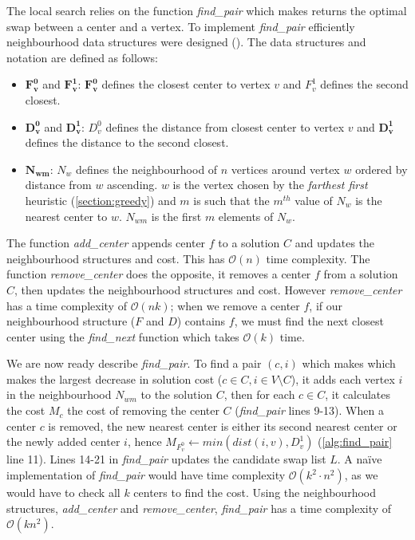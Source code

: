 The local search relies on the function \emph{find\_pair} which makes returns the optimal swap between a center and a vertex. To implement \emph{find\_pair} efficiently neighbourhood data structures were designed (\cite{mladenovic_solving_2003,pullan_memetic_2008}). The data structures and notation are defined as follows:
\begin{itemize}
    \item $\mathbf{F^0_v}$ and $\mathbf{F^1_v}$: $\mathbf{F^0_v}$ defines the closest center to vertex $v$ and $F^1_v$ defines the second closest.
    \item $\mathbf{D^0_v}$ and $\mathbf{D^1_v}$: $D^0_v$ defines the distance from closest center to vertex $v$ and $\mathbf{D^1_v}$ defines the distance to the second closest.
    \item $\mathbf{N_{wm}}$: $N_w$ defines the neighbourhood of $n$ vertices around vertex $w$ ordered by distance from $w$ ascending. $w$ is the vertex chosen by the \emph{farthest first} heuristic (\cref{section:greedy}) and $m$ is such that the $m^{th}$ value of $N_w$ is the nearest center to $w$. $N_{wm}$ is the first $m$ elements of $N_w$.
\end{itemize}

\begin{minipage}{0.48\textwidth}
    
\end{minipage}
\hspace{0.02\textwidth}
\begin{minipage}{0.48\textwidth}
    
\end{minipage}

The function \emph{add\_center} appends center $f$ to a solution $C$ and updates the neighbourhood structures and cost. This has $\mathcal{O}(n)$ time complexity. The function \emph{remove\_center} does the opposite, it removes a center $f$ from a solution $C$, then updates the neighbourhood structures and cost. However \emph{remove\_center} has a time complexity of $\mathcal{O}(nk)$; when we remove a center $f$, if our neighbourhood structure ($F$ and $D$) contains $f$, we must find the next closest center using the \emph{find\_next} function which takes $\mathcal{O}(k)$ time.

We are now ready describe \emph{find\_pair}. To find a pair $(c, i)$ which makes which makes the largest decrease in solution cost ($c\in C, i\in V\setminus C$), it adds each vertex $i$ in the neighbourhood $N_{wm}$ to the solution $C$, then for each $c\in C$, it calculates the cost $M_c$ the cost of removing the center $C$ (\emph{find\_pair} lines 9-13). When a center $c$ is removed, the new nearest center is either its second nearest center or the newly added center $i$, hence $M_{F_v^0}\gets min(dist(i,v),D_v^1)$ (\cref{alg:find_pair} line 11). Lines 14-21 in \emph{find\_pair} updates the candidate swap list $L$. A na\"{i}ve implementation of \emph{find\_pair} would have time complexity $\mathcal{O}(k^2\cdot n^2)$, as we would have to check all $k$ centers to find the cost. Using the neighbourhood structures, \emph{add\_center} and \emph{remove\_center}, \emph{find\_pair} has a time complexity of $\mathcal{O}(kn^2)$. 

